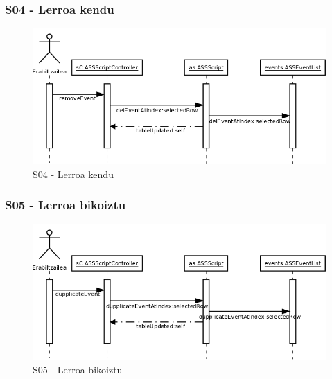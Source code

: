 \newpage
\subsubsection{S04 - Lerroa kendu}
\begin{figure}[htp]
\begin{center}
\includegraphics[scale=0.35]{Pictures/Chapter4/Diseinua/S04.png}
\caption{S04 - Lerroa kendu}
\label{s04d}
\end{center}
\end{figure}

\subsubsection{S05 - Lerroa bikoiztu}
\begin{figure}[htp]
\begin{center}
\includegraphics[scale=0.35]{Pictures/Chapter4/Diseinua/S05.png}
\caption{S05 - Lerroa bikoiztu}
\label{s05d}
\end{center}
\end{figure}

\newpage
